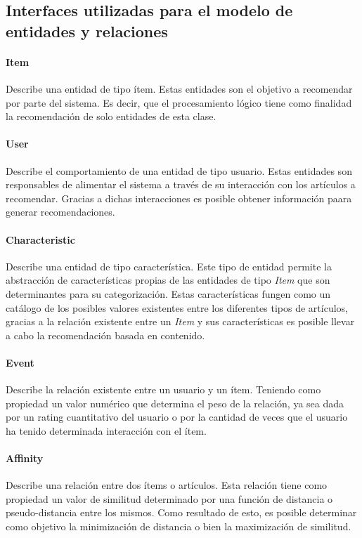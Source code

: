   \subsection{Interfaces utilizadas para el modelo de entidades y relaciones}
    \paragraph{Item}
    Describe una entidad de tipo ítem. Estas entidades son el objetivo a recomendar por parte del sistema. Es decir, que el procesamiento lógico tiene como finalidad la recomendación de solo entidades de esta clase.

    \paragraph{User}
    Describe el comportamiento de una entidad de tipo usuario. Estas entidades son responsables de alimentar el sistema a través de su interacción con los artículos a recomendar. Gracias a dichas interacciones es posible obtener información paara generar recomendaciones.

    \paragraph{Characteristic}
    Describe una entidad de tipo característica. Este tipo de entidad permite la abstracción de características propias de las entidades de tipo \emph{Item}  que son determinantes para su categorización. Estas características fungen como un catálogo de los posibles valores existentes entre los diferentes tipos de artículos, gracias a la relación existente entre un \emph{Item} y sus características es posible llevar a cabo la recomendación basada en contenido.

    \paragraph{Event}
    Describe la relación existente entre un usuario y un ítem. Teniendo como propiedad un valor numérico que determina el peso de la relación, ya sea dada por un rating cuantitativo del usuario o por la cantidad de veces que el usuario ha tenido determinada interacción con el ítem.

    \paragraph{Affinity}
    Describe una relación entre dos ítems o artículos. Esta relación tiene como propiedad un valor de similitud determinado por una función de distancia o pseudo-distancia entre los mismos. Como resultado de esto, es posible determinar como objetivo la minimización de distancia o bien la maximización de similitud.

